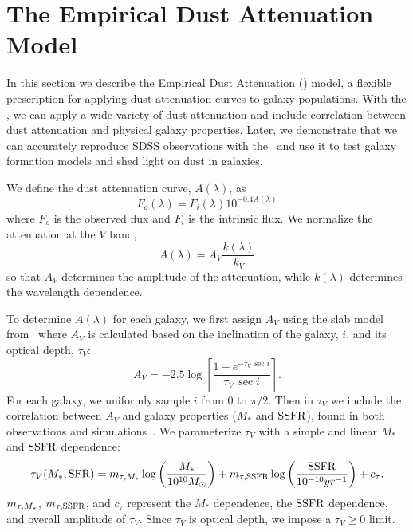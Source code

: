 \section{The Empirical Dust Attenuation Model} \label{sec:dem}
In this section we describe the Empirical Dust Attenuation (\eda) model, a
flexible prescription for applying dust attenuation curves to galaxy
populations. With the \eda, we can apply a wide variety of dust attenuation and
include correlation between dust attenuation and physical galaxy properties. 
Later, we demonstrate that we can accurately reproduce SDSS observations with
the \eda~and use it to test galaxy formation models and shed light on dust in
galaxies. 

We define the dust attenuation curve, $A(\lambda)$, as 
\begin{equation} \label{eq:full_atten}
    F_o (\lambda) = F_i (\lambda) 10^{-0.4 A(\lambda)}
\end{equation}
where $F_o$ is the observed flux and $F_i$ is the intrinsic flux. We normalize
the attenuation at the $V$ band, 
\begin{equation} 
    A(\lambda) = A_V \frac{k(\lambda)}{k_V}
\end{equation}
so that $A_V$ determines the amplitude of the attenuation, while $k(\lambda)$
determines the wavelength dependence. 

To determine $A(\lambda)$ for each galaxy, we first assign $A_V$ using the slab
model from~\citep[\eg][]{somerville1999, somerville2012} where $A_V$ is
calculated based on the inclination of the galaxy, $i$, and its optical depth, $\tau_V$: 
\begin{equation} \label{eq:slab}
    A_V = -2.5 \log \left[ \frac{1 - e^{-\tau_V\,\sec i}}{\tau_V\,\sec i} \right].
\end{equation}
For each galaxy, we uniformly sample $i$ from 0 to $\pi/2$. Then in $\tau_V$ we
include the correlation between $A_V$ and galaxy properties ($M_*$ and ${\rm SSFR}$),
found in both observations and simulations~\citep[\eg][]{narayanan2018, salim2020}. 
We parameterize $\tau_V$ with a simple and linear $M_*$ and ${\rm SSFR}$ dependence:
\begin{equation} \label{eq:tauv}
    \tau_V(M_*, \sfr) = \mtaum \log \left(\frac{M_*}{10^{10} M_\odot}\right) +
    \mtaus \log \left(\frac{\ssfr}{10^{-10}yr^{-1}}\right) + c_\tau.
\end{equation}
$m_{\tau,M_*}$, $m_{\tau,{\rm SSFR}}$, and $c_\tau$ represent the $M_*$ dependence, the ${\rm SSFR}$
dependence, and overall amplitude of $\tau_V$. Since $\tau_V$ is
optical depth, we impose a $\tau_V \ge 0$ limit.

